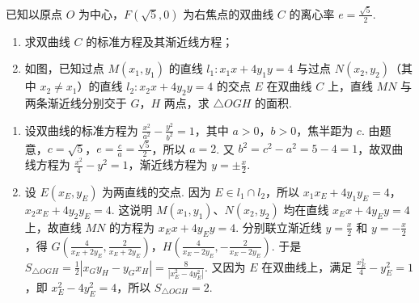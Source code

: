 \begin{problem}
已知以原点 \(O\) 为中心，\(F(\sqrt{5}, 0)\) 为右焦点的双曲线 \(C\) 的离心率 \(e = \frac{\sqrt{5}}{2}\).

\begin{enumerate}
\item 求双曲线 \(C\) 的标准方程及其渐近线方程；
\item 如图，已知过点 \(M(x_{1}, y_{1})\) 的直线 \(l_{1}: x_{1}x + 4y_{1}y = 4\) 与过点 \(N(x_{2}, y_{2})\)（其中 \(x_{2} \neq x_{1}\)）的直线 \(l_{2}: x_{2}x + 4y_{2}y = 4\) 的交点 \(E\) 在双曲线 \(C\) 上，直线 \(MN\) 与两条渐近线分别交于 \(G\)，\(H\) 两点，求 \(\triangle OGH\) 的面积.
\end{enumerate}


\begin{solution}
\begin{enumerate}
\item 设双曲线的标准方程为 \(\frac{x^2}{a^2}-\frac{y^2}{b^2}=1\)，其中 \(a>0\)，\(b>0\)，焦半距为 \(c\). 由题意，\(c=\sqrt{5}\)，\(e=\frac{c}{a}=\frac{\sqrt{5}}{2}\)，所以 \(a=2\). 又 \(b^2=c^2-a^2=5-4=1\)，故双曲线方程为 \(\frac{x^2}{4}-y^2=1\)，渐近线方程为 \(y=\pm\frac{x}{2}\).
\item 设 \(E(x_E,y_E)\) 为两直线的交点. 因为 \(E\in l_1\cap l_2\)，所以 \(x_1x_E+4y_1y_E=4\)，\(x_2x_E+4y_2y_E=4\). 这说明 \(M(x_1,y_1)\)、\(N(x_2,y_2)\) 均在直线 \(x_E x+4y_E y=4\) 上，故直线 \(MN\) 的方程为 \(x_E x+4y_E y=4\). 分别联立渐近线 \(y=\frac{x}{2}\) 和 \(y=-\frac{x}{2}\)，得
\(G\left(\frac{4}{x_E+2y_E},\frac{2}{x_E+2y_E}\right)\)，\(H\left(\frac{4}{x_E-2y_E},-\frac{2}{x_E-2y_E}\right)\).
于是 \(S_{\triangle OGH}=\frac{1}{2}\left|x_Gy_H-y_Gx_H\right|=\frac{8}{|x_E^2-4y_E^2|}\). 又因为 \(E\) 在双曲线上，满足 \(\frac{x_E^2}{4}-y_E^2=1\)，即 \(x_E^2-4y_E^2=4\)，所以 \(S_{\triangle OGH}=2\).
\end{enumerate}
\end{solution}
\end{problem}

